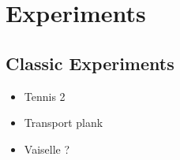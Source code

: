 \documentclass[letterpaper, 10 pt, conference]{ieeeconf}  %
\begin{document}










\section{Experiments} %
\label{sec:experiments}




\subsection{Classic Experiments} %
\label{sub:classic_experiments}




\begin{itemize}
  \item Tennis 2 
  \item Transport plank 
  \item Vaiselle ? 
\end{itemize}
\end{document}
